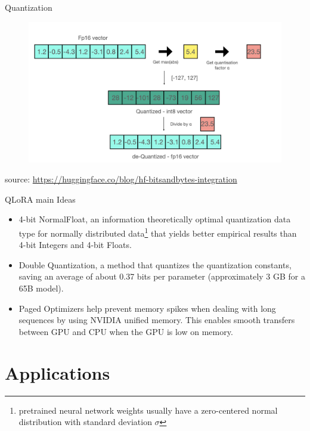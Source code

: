 \documentclass[handout]{beamer}
\begin{document}
\begin{frame}{Quantization}
     \begin{figure}[h]
	\includegraphics[scale = 0.22]{pics/quant-freeze.png}
\end{figure}
source: \url{https://huggingface.co/blog/hf-bitsandbytes-integration}
\end{frame}


\begin{frame}{QLoRA main Ideas}
\begin{scriptsize}
\begin{itemize}
\item  4-bit NormalFloat, an information theoretically optimal quantization data type for normally distributed data\footnote{pretrained neural network weights usually have a zero-centered normal distribution with standard deviation $\sigma$}  that yields better empirical results than 4-bit Integers and 4-bit Floats.
\item Double Quantization, a method that quantizes the quantization constants, saving an average of about 0.37 bits per parameter (approximately 3 GB for a 65B model).
\item Paged Optimizers help prevent memory spikes when dealing with long sequences by using NVIDIA unified memory. This enables smooth transfers between GPU and CPU when the GPU is low on memory. 
\end{itemize}
\end{scriptsize}

\end{frame}



\section{Applications}
\end{document}
